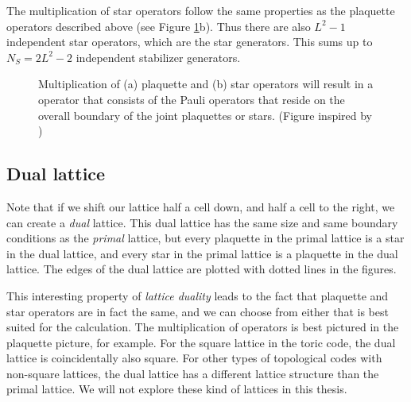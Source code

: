 The multiplication of star operators follow the same properties as the plaquette operators described above (see Figure \ref{sf:fig_multistab}b). Thus there are also $L^2 - 1$ independent star operators, which are the star generators. This sums up to $N_S = 2L^2 - 2$ independent stabilizer generators.

\begin{figure}
  \centering
  \hspace{1cm}
  \caption{Multiplication of (a) plaquette and (b) star operators will result in a operator that consists of the Pauli operators that reside on the overall boundary of the joint plaquettes or stars. (Figure inspired by \cite{browne})}\label{sf:fig_multistab}
\end{figure}

\subsection{Dual lattice}
Note that if we shift our lattice half a cell down, and half a cell to the right, we can create a \emph{dual} lattice. This dual lattice has the same size and same boundary conditions as the \emph{primal} lattice, but every plaquette in the primal lattice is a star in the dual lattice, and every star in the primal lattice is a plaquette in the dual lattice. The edges of the dual lattice are plotted with dotted lines in the figures.

This interesting property of \emph{lattice duality} leads to the fact that plaquette and star operators are in fact the same, and we can choose from either that is best suited for the calculation. The multiplication of operators is best pictured in the plaquette picture, for example. For the square lattice in the toric code, the dual lattice is coincidentally also square. For other types of topological codes with non-square lattices, the dual lattice has a different lattice structure than the primal lattice. We will not explore these kind of lattices in this thesis.

